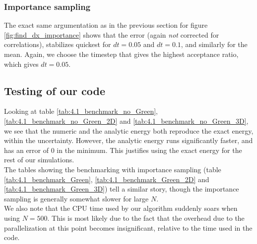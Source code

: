 \documentclass[a4paper, 10pt]{article}
\begin{document}
	\subsubsection{Importance sampling}\label{sec:Disc_importance_sampling_step_size}
	The exact same argumentation as in the previous section for figure \ref{fig:find_dx_importance} shows that the error (again \textit{not} corrected for correlations), stabilizes quickest for $dt=0.05$ and $dt=0.1$, and similarly for the mean. Again, we choose the timestep that gives the highest acceptance ratio, which gives $dt=0.05$.
	\subsection{Testing of our code}\label{sec:Desc_testing_code}
	Looking at table \ref{tab:4.1_benchmark_no_Green}, \ref{tab:4.1_benchmark_no_Green_2D} and \ref{tab:4.1_benchmark_no_Green_3D}, we see that the numeric and the analytic energy both reproduce the exact energy, within the uncertainty.  However, the analytic energy runs significantly faster, and has an error of $0$ in the minimum. This justifies using the exact energy for the rest of our simulations.\\
	\linebreak
	The tables showing the benchmarking with importance sampling (table \ref{tab:4.1_benchmark_Green}, \ref{tab:4.1_benchmark_Green_2D} and \ref{tab:4.1_benchmark_Green_3D}) tell a similar story, though the importance sampling is generally somewhat slower for large $N$.\\
	\linebreak
	We also note that the CPU time used by our algorithm suddenly soars when using $N=500$. This is most likely due to the fact that the overhead due to the parallelization at this point becomes insignificant, relative to the time used in the code.
\end{document}
